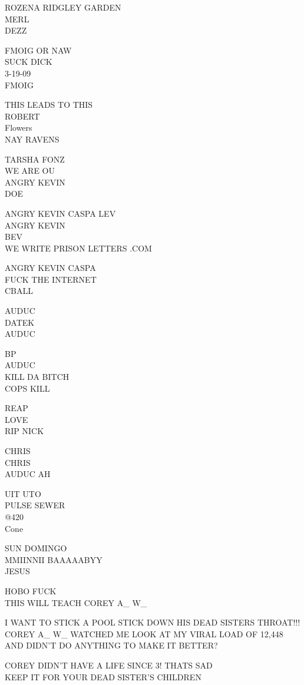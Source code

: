 \documentclass[10pt,letterpaper]{article}
\begin{document}
ROZENA RIDGLEY GARDEN\\
MERL\\
DEZZ

FMOIG OR NAW\\
SUCK DICK\\
3{-}19{-}09\\
FMOIG

THIS LEADS TO THIS\\
ROBERT\\
Flowers\\
NAY RAVENS

TARSHA FONZ\\
WE ARE OU\\
ANGRY KEVIN\\
DOE

ANGRY KEVIN CASPA LEV\\
ANGRY KEVIN\\
BEV\\
WE WRITE PRISON LETTERS .COM

ANGRY KEVIN CASPA\\
FUCK THE INTERNET\\
CBALL

AUDUC\\
DATEK\\
AUDUC

BP\\
AUDUC\\
KILL DA BITCH\\
COPS KILL

REAP\\
LOVE\\
RIP NICK

CHRIS\\
CHRIS\\
AUDUC AH

UIT UTO\\
PULSE SEWER\\
@420\\
Cone

SUN DOMINGO\\
MMIINNII BAAAAABYY\\
JESUS

HOBO FUCK\\
THIS WILL TEACH COREY A\_ W\_

I WANT TO STICK A POOL STICK DOWN HIS DEAD SISTERS THROAT!!!\\
COREY A\_ W\_ WATCHED ME LOOK AT MY VIRAL LOAD OF 12,448 AND DIDN'T DO ANYTHING TO MAKE IT BETTER?

COREY DIDN'T HAVE A LIFE SINCE 3!  THATS SAD\\
KEEP IT FOR YOUR DEAD SISTER'S CHILDREN
\end{document}
